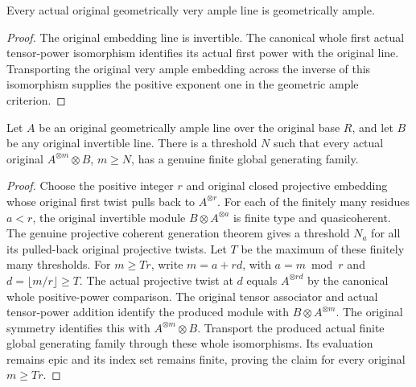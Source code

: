 \begin{lemma}
\label{lem:fc-original-very-ample-is-ample}
\leanok
{}
Every actual original geometrically very ample line is geometrically ample.
\end{lemma}
\begin{proof}
The original embedding line is invertible. The canonical whole first
actual tensor-power isomorphism identifies its actual first power with
the original line. Transporting the original very ample embedding across
the inverse of this isomorphism supplies the positive exponent one in
the geometric ample criterion.
\end{proof}

\begin{lemma}
\label{lem:fc-original-ample-line-twist-generation}
\leanok
{}
Let $A$ be an original geometrically ample line over the original base
$R$, and let $B$ be any original invertible line. There is a threshold
$N$ such that every actual original $A^{\otimes m}\otimes B$, $m\geq N$,
has a genuine finite global generating family.
\end{lemma}
\begin{proof}
Choose the positive integer $r$ and original closed projective embedding
whose original first twist pulls back to $A^{\otimes r}$. For each of
the finitely many residues $a<r$, the original invertible module
$B\otimes A^{\otimes a}$ is finite type and quasicoherent. The genuine
projective coherent generation theorem gives a threshold $N_a$ for all
its pulled-back original projective twists. Let $T$ be the maximum of
these finitely many thresholds. For $m\geq Tr$, write $m=a+rd$, with
$a=m\bmod r$ and $d=\lfloor m/r\rfloor\geq T$. The actual projective
twist at $d$ equals $A^{\otimes rd}$ by the canonical whole positive-power
comparison. The original tensor associator and actual tensor-power
addition identify the produced module with $B\otimes A^{\otimes m}$.
The original symmetry identifies this with $A^{\otimes m}\otimes B$.
Transport the produced actual finite global generating family through
these whole isomorphisms. Its evaluation remains epic and its index
set remains finite, proving the claim for every original $m\geq Tr$.
\end{proof}

